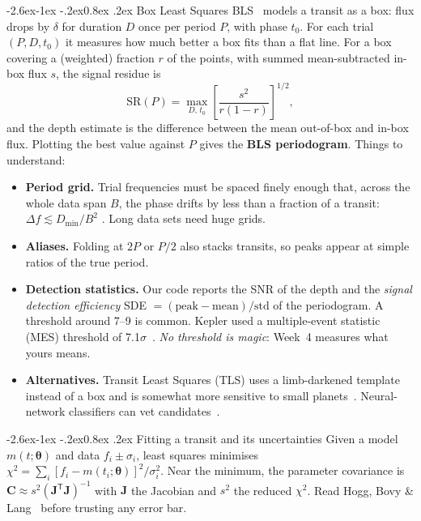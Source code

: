 \documentclass[11pt,a4paper]{article}
\makeatletter
\renewcommand\subsection{\@startsection{subsection}{2}{\z@}%
  {-2.6ex\@plus -1ex \@minus -.2ex}{0.8ex \@plus .2ex}%
  {\normalfont\sffamily\Large\bfseries\color{navy}}}
\makeatother
\begin{document}
\subsection{Box Least Squares}
\label{sec:bls}
BLS~\citep{Kovacs2002} models a transit as a box: flux drops by \(\delta\) for duration \(D\) once per period \(P\), with phase \(t_0\).
For each trial \((P, D, t_0)\) it measures how much better a box fits than a flat line. For a box covering a (weighted)
fraction \(r\) of the points, with summed mean-subtracted in-box flux \(s\), the signal residue is
\begin{equation}
  \mathrm{SR}(P) = \max_{D,\,t_0}\left[\frac{s^2}{r(1-r)}\right]^{1/2},
\end{equation}
and the depth estimate is the difference between the mean out-of-box and in-box flux. Plotting the best value against \(P\)
gives the \textbf{BLS periodogram}. Things to understand:
\begin{itemize}
  \item \textbf{Period grid.} Trial frequencies must be spaced finely enough that, across the whole data span \(B\), the phase drifts by
        less than a fraction of a transit: \(\Delta f \lesssim D_\text{min}/B^2\) \citep{Ofir2014}. Long data sets need huge grids.
  \item \textbf{Aliases.} Folding at \(2P\) or \(P/2\) also stacks transits, so peaks appear at simple ratios of the true period.
  \item \textbf{Detection statistics.} Our code reports the SNR of the depth and the \emph{signal detection efficiency}
        SDE \(= (\text{peak} - \text{mean})/\text{std}\) of the periodogram. A threshold around 7--9 is common. Kepler used a
        multiple-event statistic (MES) threshold of 7.1\(\sigma\)~\citep{Jenkins2010,Twicken2016}. \emph{No threshold is magic}:
        Week~4 measures what yours means.
  \item \textbf{Alternatives.} Transit Least Squares (TLS) uses a limb-darkened template instead of a box and is somewhat more
        sensitive to small planets~\citep{HippkeHeller2019}. Neural-network classifiers can vet candidates~\citep{ShallueVanderburg2018}.
\end{itemize}

\subsection{Fitting a transit and its uncertainties}
\label{sec:fitting}
Given a model \(m(t;\boldsymbol\theta)\) and data \(f_i\pm\sigma_i\), least squares minimises
\(\chi^2 = \sum_i [f_i - m(t_i;\boldsymbol\theta)]^2/\sigma_i^2\). Near the minimum, the parameter covariance is
\(\mathbf{C} \approx s^2(\mathbf{J}^\mathsf{T}\mathbf{J})^{-1}\) with \(\mathbf{J}\) the Jacobian and \(s^2\) the reduced \(\chi^2\).
Read Hogg, Bovy \& Lang~\citep{Hogg2010} before trusting any error bar.
\end{document}
